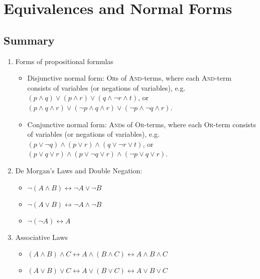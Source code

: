 \documentclass[solution, letterpaper]{cs20}
\begin{document}
	\section{Equivalences and Normal Forms}
    \subsection{Summary}
        \begin{enumerate}

        \item Forms of propositional formulas

        \begin{itemize}
          \item  Disjunctive normal form: \textsc{Or}s of \textsc{And}-terms, where each \textsc{And}-term consists of variables (or negations of variables), e.g. $(p \land q) \lor (p \land r) \lor (q \land \lnot r \land t) $, or $(p \land q \land  r) \lor (\lnot p \land q \land r)\lor (\lnot p \land \lnot q \land r) $.
          \item Conjunctive normal form: \textsc{And}s of \textsc{Or}-terms, where each \textsc{Or}-term consists of variables (or negations of variables), e.g. $(p \lor \lnot q) \land (p \lor r) \land (q \lor \lnot r \lor t)$, or $(p \lor q \lor r) \land (p \lor \lnot q \lor r) \land (\lnot p \lor q \lor r)$.

        \end{itemize}

        \item De Morgan's Laws and Double Negation:
          \begin{itemize}
            \item $\lnot (A \land B) \longleftrightarrow \lnot A \lor \lnot B$
            \item $\lnot (A \lor B) \longleftrightarrow \lnot A \land \lnot B$
            \item $\lnot (\lnot A) \longleftrightarrow A$
          \end{itemize}

        \item Associative Laws
          \begin{itemize}
            \item $(A \land B) \land C \longleftrightarrow A \land (B \land C) \longleftrightarrow A \land B \land C$
            \item $(A \lor B) \lor C \longleftrightarrow A \lor (B \lor C) \longleftrightarrow A \lor B \lor C$
          \end{itemize}


\end{enumerate}
\end{document}
